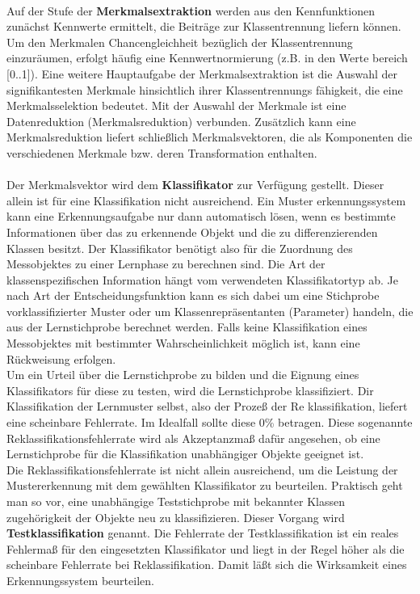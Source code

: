 \paragraph{}
Auf der Stufe der \textbf{Merkmalsextraktion} werden aus den Kennfunktionen
zun\"achst Kennwerte ermittelt, die Beitr\"age zur Klassentrennung liefern
k\"onnen. Um den Merkmalen Chancengleichheit bez\"uglich der Klassentrennung
einzur\"aumen, erfolgt h\"aufig eine Kennwertnormierung (z.B. in den Werte%
bereich [0..1]). Eine weitere Hauptaufgabe der Merkmalsextraktion ist die
Auswahl der signifikantesten Merkmale hinsichtlich ihrer Klassentrennungs%
f\"ahigkeit, die eine Merkmalsselektion bedeutet. Mit der Auswahl der Merkmale
ist eine Datenreduktion (Merkmalsreduktion) verbunden. Zus\"atzlich kann eine
Merkmalsreduktion liefert schlie\ss{}lich Merkmalsvektoren, die als Komponenten
die verschiedenen Merkmale bzw. deren Transformation enthalten.

\paragraph{}
Der Merkmalsvektor wird dem \textbf{Klassifikator} zur Verf\"ugung gestellt.
Dieser allein ist f\"ur eine Klassifikation nicht ausreichend. Ein Muster%
erkennungssystem kann eine Erkennungsaufgabe nur dann automatisch l\"osen,
wenn es bestimmte Informationen \"uber das zu erkennende Objekt und die zu
differenzierenden Klassen besitzt. Der Klassifikator ben\"otigt also f\"ur die
Zuordnung des Messobjektes zu einer Lernphase zu berechnen sind. Die Art der
klassenspezifischen Information h\"angt vom verwendeten Klassifikatortyp ab. Je
nach Art der Entscheidungsfunktion kann es sich dabei um eine Stichprobe
vorklassifizierter Muster oder um Klassenrepr\"asentanten (Parameter) handeln,
die aus der Lernstichprobe berechnet werden. Falls keine Klassifikation eines
Messobjektes mit bestimmter Wahrscheinlichkeit m\"oglich ist, kann eine
R\"uckweisung erfolgen.\\
Um ein Urteil \"uber die Lernstichprobe zu bilden und die Eignung eines
Klassifikators f\"ur diese zu testen, wird die Lernstichprobe klassifiziert.
Dir Klassifikation der Lernmuster selbst, also der Proze\ss{} der Re%
klassifikation, liefert eine scheinbare Fehlerrate. Im Idealfall sollte
diese 0\% betragen. Diese sogenannte Reklassifikationsfehlerrate wird als
Akzeptanzma\ss{} daf\"ur angesehen, ob eine Lernstichprobe f\"ur die
Klassifikation unabh\"angiger Objekte geeignet ist.\\
Die Reklassifikationsfehlerrate ist nicht allein ausreichend, um die Leistung
der Mustererkennung mit dem gew\"ahlten Klassifikator zu beurteilen. Praktisch
geht man so vor, eine unabh\"angige Teststichprobe mit bekannter Klassen%
zugeh\"origkeit der Objekte neu zu klassifizieren. Dieser Vorgang wird \textbf{%
Testklassifikation} genannt. Die Fehlerrate der Testklassifikation ist ein
reales Fehlerma\ss{} f\"ur den eingesetzten Klassifikator und liegt in der Regel
h\"oher als die scheinbare Fehlerrate bei Reklassifikation. Damit l\"a\ss{}t
sich die Wirksamkeit eines Erkennungssystem beurteilen.